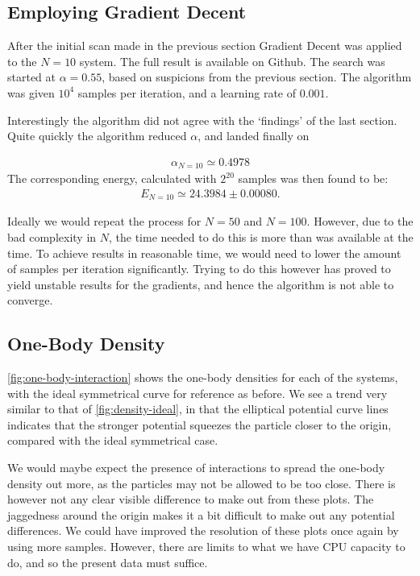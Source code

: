 \documentclass[a4paper, 11pt]{article}
\begin{document}
\begin{multicols}{2}

\subsection{Employing Gradient Decent}

After the initial scan made in the previous section Gradient Decent was applied
to the $N=10$ system. The full result is available on Github. The search was
started at $\alpha=0.55$, based on suspicions from the previous section. The
algorithm was given $10^4$ samples per iteration, and a learning rate of
$0.001$. 

Interestingly the algorithm did not agree with the {\lq findings\rq} of the last
section. Quite quickly the algorithm reduced $\alpha$, and landed finally on

\begin{align}
    \alpha_{N=10} \simeq 0.4978
\end{align}
The corresponding energy, calculated with $2^{20}$ samples was then found to be:
\begin{align}
    E_{N=10} \simeq 24.3984 \pm 0.00080.
\end{align}

Ideally we would repeat the process for $N=50$ and $N=100$. However, due to the
bad complexity in $N$, the time needed to do this is more than was available at
the time. To achieve results in reasonable time, we would need to lower the
amount of samples per iteration significantly. Trying to do this however has
proved to yield unstable results for the gradients, and hence the algorithm is
not able to converge. 


\subsection{One-Body Density}

\autoref{fig:one-body-interaction} shows the one-body densities for each of the
systems, with the ideal symmetrical curve for reference as before. We see a
trend very similar to that of \autoref{fig:density-ideal}, in that the
elliptical potential curve lines indicates that the stronger potential squeezes the
particle closer to the origin, compared with the ideal symmetrical case. 

We would maybe expect the presence of interactions to spread the one-body
density out more, as the particles may not be allowed to be too close. There is
however not any clear visible difference to make out from these plots. The
jaggedness around the origin makes it a bit difficult to make out any potential
differences. We could have improved the resolution of these plots once again by
using more samples. However, there are limits to what we have CPU capacity to
do, and so the present data must suffice.


\end{multicols}
\end{document}

